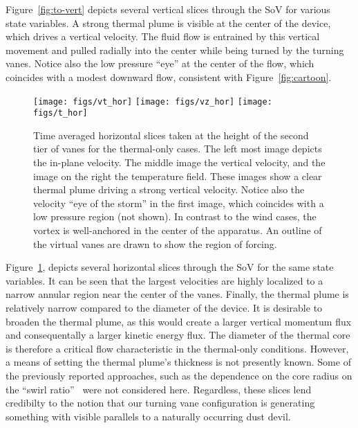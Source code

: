%
%
%
Figure~\ref{fig:to-vert} depicts several vertical slices through the SoV
for various state variables. A strong thermal plume is visible at the
center of the device, which drives a vertical velocity. The fluid flow
is entrained by this vertical movement and pulled radially into the
center while being turned by the turning vanes. Notice also the low
pressure ``eye'' at the center of the flow, which coincides with a 
modest downward flow, consistent with Figure~\ref{fig:cartoon}. 

\begin{figure}[htb]

 \centering
  \texttt{[image: figs/vt\_hor]}
 \hfill
  \texttt{[image: figs/vz\_hor]}
 \hfill
  \texttt{[image: figs/t\_hor]}
 \caption{Time averaged horizontal slices taken at the height of the
 second tier of vanes for the thermal-only cases. The left most image
 depicts the in-plane velocity. The middle image the vertical velocity,
 and the image on the right the temperature field. These images show a
 clear thermal plume driving a strong vertical velocity. Notice also the
 velocity ``eye of the storm'' in the first image, which coincides with
 a low pressure region (not shown). In contrast to the wind cases, the
 vortex is well-anchored in the center of the apparatus. An outline of
 the virtual vanes are drawn to show the region of forcing.}
 \label{fig:to-hor}
\end{figure}

Figure~\ref{fig:to-hor}, depicts several horizontal slices
through the SoV for the same state variables. It can be seen that the
largest velocities are highly localized to a narrow annular region near
the center of the vanes. 
%
%
Finally, the thermal plume is relatively narrow compared to the diameter
of the device. It is desirable to broaden the thermal plume, as this
would create a larger vertical momentum flux and consequentally a larger
kinetic energy flux.  
The diameter of the thermal core is therefore a critical flow
characteristic in the thermal-only conditions. However, a means of
setting the thermal plume's thickness is not presently 
known. Some of the previously reported approaches, such as the
dependence on the core radius on the  ``swirl
ratio''~\cite{davies1973dependence} were not considered here. 
Regardless, these slices lend credibilty to the 
notion that our turning vane configuration is generating something with  
visible parallels to a naturally occurring dust devil.   

